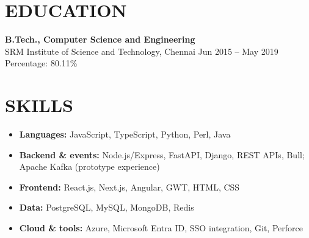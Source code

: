 \documentclass[10pt]{article}
\begin{document}
\section*{EDUCATION}
\textbf{B.Tech., Computer Science and Engineering}\\
SRM Institute of Science and Technology, Chennai \hfill Jun 2015 -- May 2019\\
Percentage: 80.11\%

\section*{SKILLS}
\begin{itemize}
  \item \textbf{Languages:} JavaScript, TypeScript, Python, Perl, Java
  \item \textbf{Backend \& events:} Node.js/Express, FastAPI, Django, REST APIs, Bull; Apache Kafka (prototype experience)
  \item \textbf{Frontend:} React.js, Next.js, Angular, GWT, HTML, CSS
  \item \textbf{Data:} PostgreSQL, MySQL, MongoDB, Redis
  \item \textbf{Cloud \& tools:} Azure, Microsoft Entra ID, SSO integration, Git, Perforce
\end{itemize}
\end{document}

